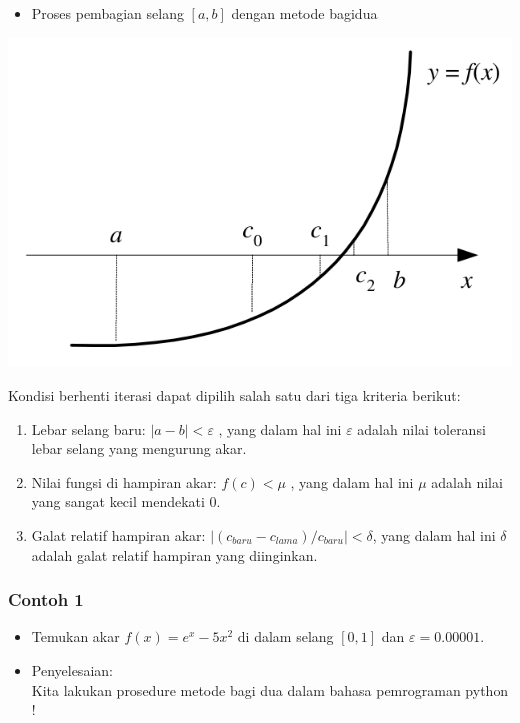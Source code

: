 \documentclass[pdflatex,compress]{beamer}
\begin{document}
\begin{frame}
	\begin{itemize}
		\item Proses pembagian selang $ [a, b] $ dengan metode bagidua
	\end{itemize}
	\begin{center}
		\includegraphics[width=0.7\linewidth]{img/img06.png}
	\end{center}
\end{frame}

\begin{frame}
	Kondisi berhenti iterasi dapat dipilih salah satu dari tiga kriteria berikut:
	\begin{enumerate}
		\item Lebar selang baru: $|a - b| < \varepsilon$ , yang dalam hal ini $\varepsilon$ adalah nilai toleransi lebar selang yang mengurung akar.
		\item Nilai fungsi di hampiran akar: $ f(c) < \mu $ , yang dalam hal ini $\mu$ adalah nilai yang sangat kecil mendekati 0.
		\item Galat relatif hampiran akar: $ |(c_{baru} - c_{lama}) / c_{baru}| < \delta $, yang dalam hal ini $\delta$ adalah galat relatif hampiran yang diinginkan.
	\end{enumerate}
\end{frame}

\begin{frame}
	\frametitle{Contoh 1}
	\begin{itemize}
		\item Temukan akar $ f(x) = e^x - 5x^2 $ di dalam selang $ [0, 1] $ dan $ \varepsilon = 0.00001 $.
		\item Penyelesaian:\\Kita lakukan prosedure metode bagi dua dalam bahasa pemrograman python !
	\end{itemize}
\end{frame}
\end{document}
